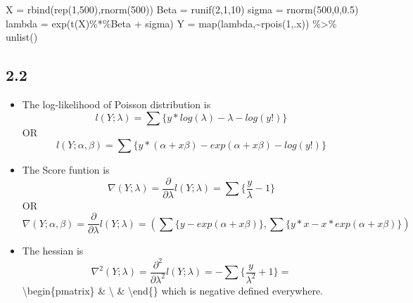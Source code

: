 \documentclass[
]{article}
\newenvironment{Shaded}{\begin{snugshade}}{\end{snugshade}}
\newcommand{\DecValTok}[1]{\textcolor[rgb]{0.00,0.00,0.81}{#1}}
\newcommand{\FloatTok}[1]{\textcolor[rgb]{0.00,0.00,0.81}{#1}}
\newcommand{\FunctionTok}[1]{\textcolor[rgb]{0.00,0.00,0.00}{#1}}
\newcommand{\NormalTok}[1]{#1}
\newcommand{\OtherTok}[1]{\textcolor[rgb]{0.56,0.35,0.01}{#1}}
\newcommand{\SpecialCharTok}[1]{\textcolor[rgb]{0.00,0.00,0.00}{#1}}
\begin{document}
\begin{Shaded}
\begin{Highlighting}[]
\NormalTok{X }\OtherTok{=} \FunctionTok{rbind}\NormalTok{(}\FunctionTok{rep}\NormalTok{(}\DecValTok{1}\NormalTok{,}\DecValTok{500}\NormalTok{),}\FunctionTok{rnorm}\NormalTok{(}\DecValTok{500}\NormalTok{))}
\NormalTok{Beta }\OtherTok{=} \FunctionTok{runif}\NormalTok{(}\DecValTok{2}\NormalTok{,}\DecValTok{1}\NormalTok{,}\DecValTok{10}\NormalTok{)}
\NormalTok{sigma }\OtherTok{=} \FunctionTok{rnorm}\NormalTok{(}\DecValTok{500}\NormalTok{,}\DecValTok{0}\NormalTok{,}\FloatTok{0.5}\NormalTok{)}
\NormalTok{lambda }\OtherTok{=} \FunctionTok{exp}\NormalTok{(}\FunctionTok{t}\NormalTok{(X)}\SpecialCharTok{\%*\%}\NormalTok{Beta }\SpecialCharTok{+}\NormalTok{ sigma)}
\NormalTok{Y }\OtherTok{=} \FunctionTok{map}\NormalTok{(lambda,}\SpecialCharTok{\textasciitilde{}}\FunctionTok{rpois}\NormalTok{(}\DecValTok{1}\NormalTok{,.x)) }\SpecialCharTok{\%\textgreater{}\%} \FunctionTok{unlist}\NormalTok{()}
\end{Highlighting}
\end{Shaded}

\hypertarget{section-1}{%
\subsection{2.2}\label{section-1}}

\begin{itemize}
\item
  The log-likelihood of Poisson distribution is
  \[l(Y;\lambda) = \sum \{y*log(\lambda) -\lambda - log(y!)\}\] OR
  \[l(Y;\alpha,\beta) = \sum \{y*(\alpha+x\beta) -exp(\alpha+x\beta) - log(y!)\}\]
\item
  The Score funtion is
  \[\nabla(Y;\lambda) = \frac{\partial}{\partial\lambda}l(Y;\lambda) = \sum\{\frac{y}{\lambda}-1\}\]
  OR
  \[\nabla(Y;\alpha,\beta) = \frac{\partial}{\partial\lambda}l(Y;\lambda) = (\sum\{y-exp(\alpha+x\beta)\},\sum\{y*x-x*exp(\alpha+x\beta)\})\]
\item
  The hessian is
  \[\nabla^2(Y;\lambda) = \frac{\partial^2}{\partial\lambda^2}l(Y;\lambda) = 
  -\sum\{\frac{y}{\lambda^2}+1\}=\] \textbackslash begin\{pmatrix\}
   \& 
  \textbackslash{}  \&
   \textbackslash end\{\pmatrix\} which is
  negative defined everywhere.
\end{itemize}
\end{document}

